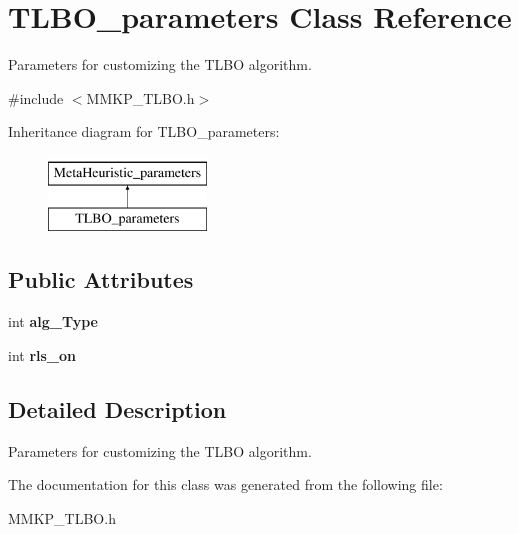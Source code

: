 \hypertarget{class_t_l_b_o__parameters}{\section{T\+L\+B\+O\+\_\+parameters Class Reference}
\label{class_t_l_b_o__parameters}
}


Parameters for customizing the T\+L\+B\+O algorithm.  




{\ttfamily \#include $<$M\+M\+K\+P\+\_\+\+T\+L\+B\+O.\+h$>$}

Inheritance diagram for T\+L\+B\+O\+\_\+parameters\+:\begin{figure}[H]
\begin{center}
\leavevmode
\includegraphics[height=2.000000cm]{class_t_l_b_o__parameters}
\end{center}
\end{figure}
\subsection*{Public Attributes}
\begin{DoxyCompactItemize}
\item 
\hypertarget{class_t_l_b_o__parameters_a7cdee97d659c7e7bd138da780dffd1e2}{int {\bfseries alg\+\_\+\+Type}}\label{class_t_l_b_o__parameters_a7cdee97d659c7e7bd138da780dffd1e2}

\item 
\hypertarget{class_t_l_b_o__parameters_a902483c11a5b7817192c890034da9d80}{int {\bfseries rls\+\_\+on}}\label{class_t_l_b_o__parameters_a902483c11a5b7817192c890034da9d80}

\end{DoxyCompactItemize}


\subsection{Detailed Description}
Parameters for customizing the T\+L\+B\+O algorithm. 

The documentation for this class was generated from the following file\+:\begin{DoxyCompactItemize}
\item 
M\+M\+K\+P\+\_\+\+T\+L\+B\+O.\+h\end{DoxyCompactItemize}
